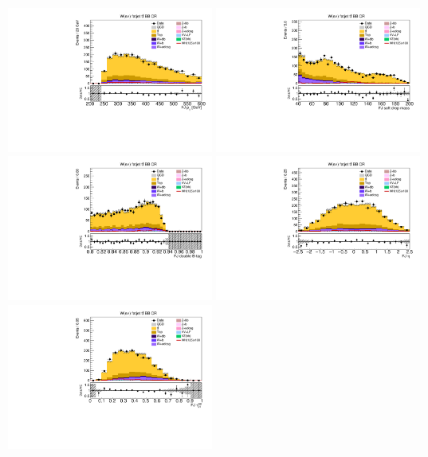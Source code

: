 \begin{figure}[tbp]
  \begin{center}
    \includegraphics[width=0.48\textwidth]{figures/wlnhbb2016/boosted/WenWHTT2bFJCR_fj1Pt.pdf}
    \includegraphics[width=0.48\textwidth]{figures/wlnhbb2016/boosted/WenWHTT2bFJCR_fj1MSD_corr.pdf}
    \includegraphics[width=0.48\textwidth]{figures/wlnhbb2016/boosted/WenWHTT2bFJCR_fj1DoubleCSV.pdf}
    \includegraphics[width=0.48\textwidth]{figures/wlnhbb2016/boosted/WenWHTT2bFJCR_fj1Eta.pdf}
    \includegraphics[width=0.48\textwidth]{figures/wlnhbb2016/boosted/WenWHTT2bFJCR_fj1Tau21SD.pdf}

\end{center}
\end{figure}
